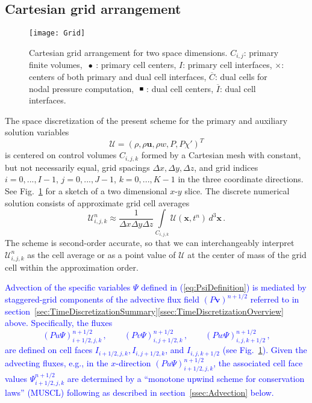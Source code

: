 \documentclass{ametsoc}
\theoremstyle{definition}
\newcommand{\klein}[1]{\textcolor{blue}{#1}}
\newcommand{\eq}[1]{(\ref{#1})}
\newcommand{\vect}[1]{{\mathbf{#1}}}
\newcommand{\vu}{\vect{u}}
\newcommand{\vv}{\vect{v}}
\newcommand{\vx}{\vect{x}}
\newcommand{\half}{1/2}
\newcommand{\dz}{\Delta z}
\newcommand{\chiprime}{{\chi'}}
\newcommand{\Sol}{\mathcal{U}}
\newcommand{\dx}{{\Delta x}}
\newcommand{\dy}{{\Delta y}}
\begin{document}
\subsection{Cartesian grid arrangement}
\label{ssec:GridArrangement}


\begin{figure}
\centering
 \texttt{[image: Grid]}
\caption{Cartesian grid arrangement for two space dimensions. 
$C_{i,j}$: primary finite volumes, 
$\ \bullet\ $: primary cell centers, $I$: primary cell interfaces,
$\times$: centers of both primary and dual cell interfaces, 
$\overline{C}$: dual cells for nodal pressure computation, $\ \rule[1pt]{4pt}{4pt}\ $:
dual cell centers, $\overline{I}$: dual cell interfaces.
\label{fig:GridArrangement}}
\end{figure}

The space discretization of the present scheme for the primary
and auxiliary solution variables 
%
\begin{equation}
\Sol = \left(\rho, \rho\vu, \rho w, P, P\chiprime \right)^T
\end{equation}
%
is centered on control volumes $C_{i,j,k}$ formed by a Cartesian mesh with constant,
but not necessarily equal, grid spacings $\dx, \dy, \dz$, and grid indices 
$i = 0, ..., I-1$, $j = 0, ..., J-1$, $k = 0, ..., K-1$ in the three coordinate directions.
See Fig.~\ref{fig:GridArrangement} for a sketch of a two dimensional $x$-$y$ slice. 
The discrete numerical solution consists of approximate grid cell averages 
%
\begin{equation}
\Sol_{i,j,k}^n \approx 
\frac{1}{\dx \dy \dz}\int\limits_{C_{i,j,k}} \Sol(\vx,t^n)\, d^3\vx\,.
\end{equation}
%
The scheme is second-order accurate, so that we can interchangeably interpret 
$\Sol_{i,j,k}^n$ as the cell average or as a point value of $\Sol$ at the center of 
mass of the grid cell within the approximation order.  

\klein{Advection of the specific variables $\Psi$ defined in \eq{eq:PsiDefinition} is mediated 
by staggered-grid components of the advective flux field $(P\vv)^{n+\half}$ referred
to in section~\ref{sec:TimeDiscretizationSummary}\ref{ssec:TimeDiscretizationOverview} 
above. Specifically, the fluxes
%
\begin{equation}\label{eq:DiscreteAdvectiveFluxes}
(Pu \Psi)^{n+\half}_{i+\half,j,k}\,,
\qquad
(Pv \Psi)^{n+\half}_{i,j+\half,k}\,, 
\qquad
(Pw \Psi)^{n+\half}_{i,j,k+\half}\,,
\end{equation}
%
are defined on cell faces $I_{i+\half,j,k}, I_{i,j+\half,k}$, and $I_{i,j,k+\half}$ 
(see Fig.~\ref{fig:GridArrangement}). 
Given the advecting fluxes, e.g., in the $x$-direction 
$(Pu \Psi)^{n+\half}_{i+\half,j,k}$, the associated cell face values 
$\Psi^{n+\half}_{i+\half,j,k}$ 
are determined by a ``monotone upwind scheme for conservation laws'' (MUSCL) following 
\citet{vanLeer2006} as described in section~\ref{ssec:Advection} below.}
\end{document}
